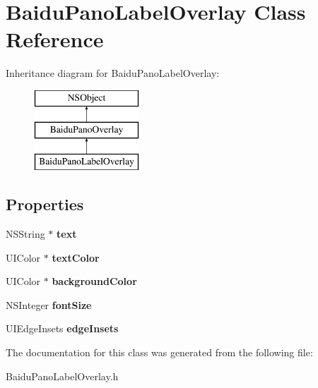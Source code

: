 \hypertarget{interface_baidu_pano_label_overlay}{}\section{Baidu\+Pano\+Label\+Overlay Class Reference}
\label{interface_baidu_pano_label_overlay}
Inheritance diagram for Baidu\+Pano\+Label\+Overlay\+:\begin{figure}[H]
\begin{center}
\leavevmode
\includegraphics[height=3.000000cm]{interface_baidu_pano_label_overlay}
\end{center}
\end{figure}
\subsection*{Properties}
\begin{DoxyCompactItemize}
\item 
\hypertarget{interface_baidu_pano_label_overlay_ae67d5a9f1f79875a58c76434abfeeee5}{}N\+S\+String $\ast$ {\bfseries text}\label{interface_baidu_pano_label_overlay_ae67d5a9f1f79875a58c76434abfeeee5}

\item 
\hypertarget{interface_baidu_pano_label_overlay_a66d1d9ede9abbb14d758c945ca41a0d3}{}U\+I\+Color $\ast$ {\bfseries text\+Color}\label{interface_baidu_pano_label_overlay_a66d1d9ede9abbb14d758c945ca41a0d3}

\item 
\hypertarget{interface_baidu_pano_label_overlay_a8a13fbcb176af2fb528e8f19955d8559}{}U\+I\+Color $\ast$ {\bfseries background\+Color}\label{interface_baidu_pano_label_overlay_a8a13fbcb176af2fb528e8f19955d8559}

\item 
\hypertarget{interface_baidu_pano_label_overlay_a47f8018dc8a0579480c74f53e3209936}{}N\+S\+Integer {\bfseries font\+Size}\label{interface_baidu_pano_label_overlay_a47f8018dc8a0579480c74f53e3209936}

\item 
\hypertarget{interface_baidu_pano_label_overlay_a2dbf3e0ea55a94c1e7e90796ea27221e}{}U\+I\+Edge\+Insets {\bfseries edge\+Insets}\label{interface_baidu_pano_label_overlay_a2dbf3e0ea55a94c1e7e90796ea27221e}

\end{DoxyCompactItemize}


The documentation for this class was generated from the following file\+:\begin{DoxyCompactItemize}
\item 
Baidu\+Pano\+Label\+Overlay.\+h\end{DoxyCompactItemize}
